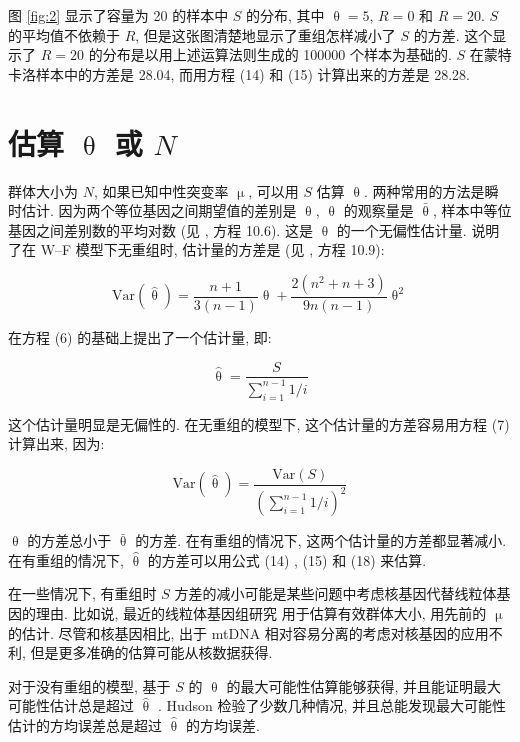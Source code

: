 \documentclass[12pt]{article}
\begin{document}
图 \ref{fig:2} 显示了容量为 20 的样本中 $S$ 的分布, 其中 $\uptheta =5$, $R=0$ 和 $R=20$. $S$ 的平均值不依赖于
$R$, 但是这张图清楚地显示了重组怎样减小了 $S$ 的方差. 这个显示了 $R=20$ 的分布是以用上述运算法则生成的 100000
个样本为基础的. $S$ 在蒙特卡洛样本中的方差是 28.04, 而用方程 (14) 和 (15) 计算出来的方差是 28.28.

\section{估算 $\uptheta$ 或 $N$}

群体大小为 $N$, 如果已知中性突变率 $\upmu$, 可以用 $S$ 估算 $\uptheta$. 两种常用的方法是瞬时估计.
因为两个等位基因之间期望值的差别是 $\uptheta$, $\uptheta$ 的观察量是 $\overset{‾}{\uptheta}$,
样本中等位基因之间差别数的平均对数 (见 \textcite{nei1987molecular}, 方程 10.6). 这是 $\uptheta$ 的一个无偏性估计量. \textcite{tajima1983} 说明了在
W--F 模型下无重组时, 估计量的方差是 (见 \textcite{nei1987molecular}, 方程 10.9):

\begin{equation} \label{eq:16}
    \text{Var}(\hat{\uptheta})=\frac{n+1}{3(n-1)}\uptheta + \frac{2(n^{2}+n+3)}{9n(n-1)}\uptheta^{2}
\end{equation}

\textcite{watterson1975} 在方程 (6) 的基础上提出了一个估计量, 即:

\begin{equation} \label{eq:17}
    \hat{\uptheta}=\frac{S}{\sum_{i=1}^{n-1}1/i}
\end{equation}

这个估计量明显是无偏性的. 在无重组的模型下, 这个估计量的方差容易用方程 (7) 计算出来, 因为:

\begin{equation} \label{eq:18}
    \text{Var}(\hat{\uptheta})=\frac{\text{Var}(S)}{\left( \sum_{i=1}^{n-1} 1/i \right)^{2}}
\end{equation}

$\uptheta$ 的方差总小于 $\overset{‾}{\uptheta}$ 的方差. 在有重组的情况下, 这两个估计量的方差都显著减小.
在有重组的情况下, $\hat{\uptheta}$ 的方差可以用公式 (14) , (15) 和 (18) 来估算.

在一些情况下, 有重组时 $S$ 方差的减小可能是某些问题中考虑核基因代替线粒体基因的理由. 比如说, 最近的线粒体基因组研究 \parencite{avise1987}
用于估算有效群体大小, 用先前的 $\upmu$ 的估计. 尽管和核基因相比, 出于 mtDNA
相对容易分离的考虑对核基因的应用不利, 但是更多准确的估算可能从核数据获得.

对于没有重组的模型, 基于 $S$ 的 $\uptheta$ 的最大可能性估算能够获得, 并且能证明最大可能性估计总是超过 $\hat{\uptheta}$
\parencite{tavare1984}. Hudson 检验了少数几种情况, 并且总能发现最大可能性估计的方均误差总是超过 $\hat{\uptheta}$ 的方均误差.
\end{document}
